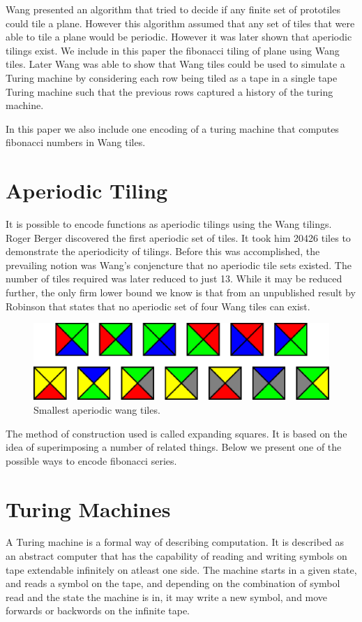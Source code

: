 \documentclass{article}
\begin{document}
Wang presented an algorithm that tried to decide if any finite set of prototiles could tile a plane. However this algorithm assumed that any set of tiles that were able to tile a plane would be periodic. However it was later shown that aperiodic tilings exist. We include in this paper the fibonacci tiling of plane using Wang tiles. Later Wang was able to show that Wang tiles could be used to simulate a Turing machine by considering each row being tiled as a tape in a single tape Turing machine such that the previous rows captured a history of the turing machine.

In this paper we also include one encoding of a turing machine that computes fibonacci numbers in Wang tiles.

\section*{Aperiodic Tiling}
It is possible to encode functions as aperiodic tilings using the Wang tilings. Roger Berger discovered the first aperiodic set of tiles\cite{undecide}. It took him 20426 tiles to demonstrate the aperiodicity of tilings. Before this was accomplished, the prevailing notion was Wang's conjencture that no aperiodic tile sets existed. The number of tiles required was later reduced to just 13. While it may be reduced further, the only firm lower bound we know is that from an unpublished result by Robinson that states that no aperiodic set of four Wang tiles can exist.

\begin{figure}
\includegraphics[scale=0.4]{wang13.eps} 
\caption{Smallest aperiodic wang tiles.}
\label{fig:wang13}
\end{figure}

The method of construction used is called expanding squares. It is based on the idea of superimposing a number of related things. Below we present one of the possible ways to encode fibonacci series.

\section*{Turing Machines}
A Turing machine is a formal way of describing computation. It is described as an abstract computer that has the capability of reading and writing symbols on tape extendable infinitely on atleast one side. The machine starts in a given state, and reads a symbol on the tape, and depending on the combination of symbol read and the state the machine is in, it may write a new symbol, and move forwards or backwords on the infinite tape.
\end{document}
